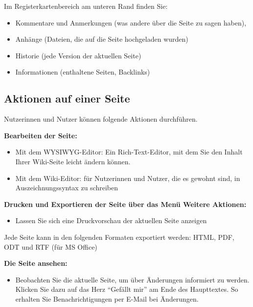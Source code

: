 \documentclass[
  letterpaper,
  DIV=11,
  numbers=noendperiod]{scrreprt}
\providecommand{\tightlist}{%
  \setlength{\itemsep}{0pt}\setlength{\parskip}{0pt}}\usepackage{longtable,booktabs,array}
\begin{document}
Im Registerkartenbereich am unteren Rand finden Sie:

\begin{itemize}
\tightlist
\item
  Kommentare und Anmerkungen (was andere über die Seite zu sagen haben),
\item
  Anhänge (Dateien, die auf die Seite hochgeladen wurden)
\item
  Historie (jede Version der aktuellen Seite)
\item
  Informationen (enthaltene Seiten, Backlinks)
\end{itemize}

\subsection{Aktionen auf einer Seite}\label{aktionen-auf-einer-seite}

Nutzerinnen und Nutzer können folgende Aktionen durchführen.

\textbf{Bearbeiten der Seite:}

\begin{itemize}
\tightlist
\item
  Mit dem WYSIWYG-Editor: Ein Rich-Text-Editor, mit dem Sie den Inhalt
  Ihrer Wiki-Seite leicht ändern können.
\item
  Mit dem Wiki-Editor: für Nutzerinnen und Nutzer, die es gewohnt sind,
  in Auszeichnungssyntax zu schreiben
\end{itemize}

\textbf{Drucken und Exportieren der Seite über das Menü Weitere
Aktionen:}

\begin{itemize}
\tightlist
\item
  Lassen Sie sich eine Druckvorschau der aktuellen Seite anzeigen
\end{itemize}

Jede Seite kann in den folgenden Formaten exportiert werden: HTML, PDF,
ODT und RTF (für MS Office)

\textbf{Die Seite ansehen:}

\begin{itemize}
\tightlist
\item
  Beobachten Sie die aktuelle Seite, um über Änderungen informiert zu
  werden. Klicken Sie dazu auf das Herz ``Gefällt mir'' am Ende des
  Haupttextes. So erhalten Sie Benachrichtigungen per E-Mail bei
  Änderungen.
\end{itemize}
\end{document}
